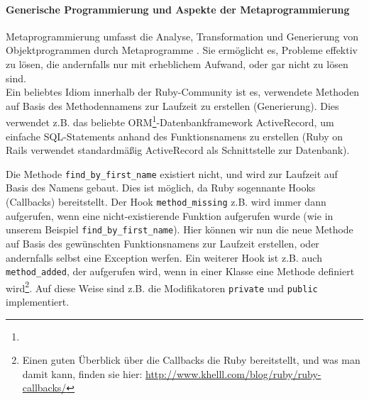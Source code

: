 \paragraph{Generische Programmierung und Aspekte der Metaprogrammierung}
Metaprogrammierung umfasst die Analyse, Transformation und Generierung von Objektprogrammen durch Metaprogramme \citep{herrmann_2005}.  Sie ermöglicht es, Probleme effektiv zu lösen, die andernfalls nur mit erheblichem Aufwand, oder gar nicht zu lösen sind.\\
Ein beliebtes Idiom innerhalb der Ruby-Community ist es, verwendete Methoden auf Basis des Methodennamens zur Laufzeit zu erstellen (Generierung). Dies verwendet z.B. das beliebte ORM\footnote{}-Datenbankframework ActiveRecord, um einfache SQL-Statements anhand des Funktionsnamens zu erstellen (Ruby on Rails verwendet standardmäßig ActiveRecord als Schnittstelle zur Datenbank).
\begin{ruby}[label=IRB]
\end{ruby}


Die Methode \texttt{find\_by\_first\_name} existiert nicht, und wird zur Laufzeit auf Basis des Namens gebaut. Dies ist möglich, da Ruby sogennante Hooks (Callbacks) bereitstellt. Der Hook \texttt{method\_missing} z.B. wird immer dann aufgerufen, wenn eine nicht-existierende Funktion aufgerufen wurde (wie in unserem Beispiel \texttt{find\_by\_first\_name}). Hier können wir nun die neue Methode auf Basis des gewünschten Funktionsnamens zur Laufzeit erstellen, oder andernfalls selbst eine Exception werfen. Ein weiterer Hook ist z.B. auch \texttt{method\_added}, der aufgerufen wird, wenn in einer Klasse eine Methode definiert wird\footnote{Einen guten Überblick über die Callbacks die Ruby bereitstellt, und was man damit kann, finden sie hier: \url{http://www.khelll.com/blog/ruby/ruby-callbacks/}}. Auf diese Weise sind z.B. die Modifikatoren \texttt{private} und \texttt{public} implementiert.

